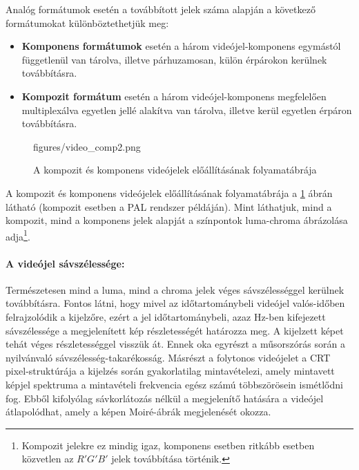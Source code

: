 Analóg formátumok esetén a továbbított jelek száma alapján a következő formátumokat különböztethetjük meg:
\begin{itemize}
\item \textbf{Komponens formátumok} esetén a három videójel-komponens egymástól függetlenül van tárolva, illetve párhuzamosan, külön érpárokon kerülnek továbbításra.
\item \textbf{Kompozit formátum} esetén a három videójel-komponens megfelelően multiplexálva egyetlen jellé alakítva van tárolva, illetve kerül egyetlen érpáron továbbításra.
\end{itemize}
\begin{figure}[]
	\centering
	\begin{overpic}[width = 0.90\columnwidth ]{figures/video_comp2.png}
	\end{overpic}
	\caption{A kompozit és komponens videójelek előállításának folyamatábrája}
	\label{Fig:video_components}
\end{figure}
A kompozit és komponens videójelek előállításának folyamatábrája a \ref{Fig:video_components} ábrán látható (kompozit esetben a PAL rendszer példáján).
Mint láthatjuk, mind a kompozit, mind a komponens jelek alapját a színpontok luma-chroma ábrázolása adja\footnote{Kompozit jelekre ez mindig igaz, komponens esetben ritkább esetben közvetlen az $R'G'B'$ jelek továbbítása történik.}.

\vspace{3mm}
\paragraph{A videójel sávszélessége:}
Természetesen mind a luma, mind a chroma jelek véges sávszélességgel kerülnek továbbításra.
Fontos látni, hogy mivel az időtartománybeli videójel valós-időben felrajzolódik a kijelzőre, ezért a jel időtartománybeli, azaz Hz-ben kifejezett sávszélessége a megjelenített kép részletességét határozza meg.
A kijelzett képet tehát véges részletességgel visszük át.
Ennek oka egyrészt a műsorszórás során a nyilvánvaló sávszélesség-takarékosság.
Másrészt a folytonos videójelet a CRT pixel-struktúrája a kijelzés során gyakorlatilag mintavételezi, amely mintavett képjel spektruma a mintavételi frekvencia egész számú többszörösein ismétlődni fog.
Ebből kifolyólag sávkorlátozás nélkül a megjelenítő hatására a videójel átlapolódhat, amely a képen Moiré-ábrák megjelenését okozza.


